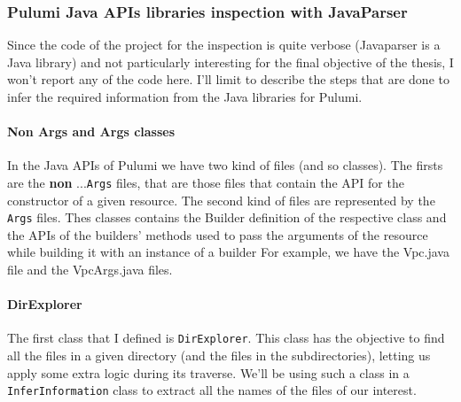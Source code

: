 \subsubsection{Pulumi Java APIs libraries inspection with JavaParser}
Since the code of the project for the inspection is quite verbose (Javaparser is a Java library) and not particularly interesting for the final objective of the thesis, I won't report any of the code here.
I'll limit to describe the steps that are done to infer the required information from the Java libraries for Pulumi.

\paragraph{Non Args and Args classes}
In the Java APIs of Pulumi we have two kind of files (and so classes).
The firsts are the \textbf{non} ...\texttt{Args} files, that are those files that contain the API for the constructor of a given resource.
The second kind of files are represented by the \texttt{Args} files.
Thes classes contains the Builder definition of the respective class and the APIs of the builders' methods used to pass the arguments of the resource while building it with an instance of a builder
For example, we have the Vpc.java file and the VpcArgs.java files.

\paragraph{DirExplorer}
The first class that I defined is \texttt{DirExplorer}. This class has the objective to find all the files in a given directory (and the files in the subdirectories), letting us apply some extra logic during its traverse.
We'll be using such a class in a \texttt{InferInformation} class to extract all the names of the files of our interest.\\

